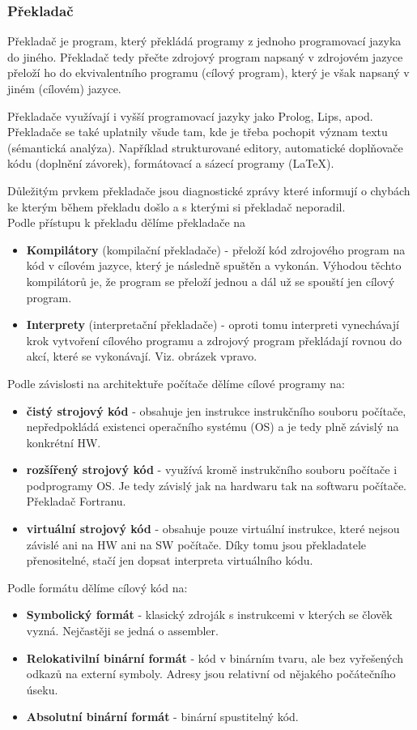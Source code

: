 \documentclass[10pt,a4paper]{article}
\begin{document}
\subsubsection{Překladač}
Překladač je program, který překládá programy z jednoho programovací jazyka do jiného. Překladač tedy přečte zdrojový program napsaný v zdrojovém jazyce přeloží ho do ekvivalentního programu (cílový program), který je však napsaný v jiném (cílovém) jazyce. \par
Překladače využívají i vyšší programovací jazyky jako Prolog, Lips, apod.  Překladače se také uplatnily všude tam, kde je třeba pochopit význam textu (sémantická analýza). Například strukturované editory, automatické doplňovače kódu (doplnění závorek), formátovací a sázecí programy (\LaTeX).\par
Důležitým prvkem překladače jsou diagnostické zprávy které informují o chybách ke kterým během překladu došlo a s kterými si překladač neporadil.\\
Podle přístupu k překladu dělíme překladače na
\begin{itemize}
\item \textbf{Kompilátory} (kompilační překladače)  - přeloží kód zdrojového program na kód v cílovém jazyce, který je následně spuštěn a vykonán. Výhodou těchto kompilátorů je, že program se přeloží jednou a dál už se spouští jen cílový program.
\item \textbf{Interprety} (interpretační překladače) - oproti tomu interpreti vynechávají krok vytvoření cílového programu a zdrojový program překládají rovnou do akcí, které se vykonávají. Viz. obrázek vpravo.
\end{itemize}
Podle závislosti na architektuře počítače dělíme cílové programy na:
\begin{itemize}
\item \textbf{čistý strojový kód} - obsahuje jen instrukce instrukčního souboru počítače, nepředpokládá existenci operačního systému (OS) a je tedy plně závislý na konkrétní HW.
\item \textbf{rozšířený strojový kód} - využívá kromě instrukčního souboru počítače i podprogramy OS. Je tedy závislý jak na hardwaru tak na softwaru počítače. Překladač Fortranu.
\item \textbf{virtuální strojový kód} - obsahuje pouze virtuální instrukce, které nejsou závislé ani na HW ani na SW počítače. Díky tomu jsou překladatele přenositelné, stačí jen dopsat interpreta virtuálního kódu.
\end{itemize}
Podle formátu dělíme cílový kód na:
\begin{itemize}
\item \textbf{Symbolický formát} - klasický zdroják s instrukcemi v kterých se člověk vyzná. Nejčastěji se jedná o assembler.
\item \textbf{Relokativilní binární formát} - kód v binárním tvaru, ale bez vyřešených odkazů na externí symboly. Adresy jsou relativní od nějakého počátečního úseku.
\item \textbf{Absolutní binární formát} - binární spustitelný kód.
\end{itemize}
\end{document}
